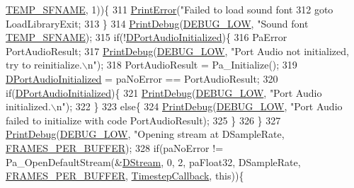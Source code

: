 \begin{DoxyCode}
{{{{{{{{{{{{      \hyperlink{SoundLibraryMixer_8cpp_a1ba6e33012d926b97ef45f11d1f703ac}{TEMP\_SFNAME}, 1))\{
311         \hyperlink{Debug_8h_a2ed825eefefe35baf59a93a8c641323d}{PrintError}(\textcolor{stringliteral}{"Failed to load sound font %
312         \textcolor{keywordflow}{goto} LoadLibraryExit;
313     \}
314     \hyperlink{Debug_8h_aa5f00f5537c9760f6ae1782460748ab9}{PrintDebug}(\hyperlink{Debug_8h_a3a5f3fc09784650d8388cb854882f840}{DEBUG\_LOW}, \textcolor{stringliteral}{"Sound font %
      \hyperlink{SoundLibraryMixer_8cpp_a1ba6e33012d926b97ef45f11d1f703ac}{TEMP\_SFNAME});
315     \textcolor{keywordflow}{if}(!\hyperlink{classCSoundLibraryMixer_a1c78419f5e6cfdf4bc879bb5eedf52f0}{DPortAudioInitialized})\{
316         PaError PortAudioResult;
317         \hyperlink{Debug_8h_aa5f00f5537c9760f6ae1782460748ab9}{PrintDebug}(\hyperlink{Debug_8h_a3a5f3fc09784650d8388cb854882f840}{DEBUG\_LOW}, \textcolor{stringliteral}{"Port Audio not initialized, try to reinitialize.\(\backslash\)n"});
318         PortAudioResult = Pa\_Initialize();    
319         \hyperlink{classCSoundLibraryMixer_a1c78419f5e6cfdf4bc879bb5eedf52f0}{DPortAudioInitialized} = paNoError == PortAudioResult;
320         \textcolor{keywordflow}{if}(\hyperlink{classCSoundLibraryMixer_a1c78419f5e6cfdf4bc879bb5eedf52f0}{DPortAudioInitialized})\{
321             \hyperlink{Debug_8h_aa5f00f5537c9760f6ae1782460748ab9}{PrintDebug}(\hyperlink{Debug_8h_a3a5f3fc09784650d8388cb854882f840}{DEBUG\_LOW}, \textcolor{stringliteral}{"Port Audio initialized.\(\backslash\)n"});
322         \}
323         \textcolor{keywordflow}{else}\{
324             \hyperlink{Debug_8h_aa5f00f5537c9760f6ae1782460748ab9}{PrintDebug}(\hyperlink{Debug_8h_a3a5f3fc09784650d8388cb854882f840}{DEBUG\_LOW}, \textcolor{stringliteral}{"Port Audio failed to initialize with code %
      PortAudioResult);
325         \}
326     \}
327     \hyperlink{Debug_8h_aa5f00f5537c9760f6ae1782460748ab9}{PrintDebug}(\hyperlink{Debug_8h_a3a5f3fc09784650d8388cb854882f840}{DEBUG\_LOW}, \textcolor{stringliteral}{"Opening stream at %
      DSampleRate, \hyperlink{SoundLibraryMixer_8cpp_af4f62216aa14e0407faa6631e9ec4c62}{FRAMES\_PER\_BUFFER});
328     \textcolor{keywordflow}{if}(paNoError != Pa\_OpenDefaultStream(&\hyperlink{classCSoundLibraryMixer_ad992cd6202130db3a45ca695eca34625}{DStream}, 0, 2, paFloat32, DSampleRate, 
      \hyperlink{SoundLibraryMixer_8cpp_af4f62216aa14e0407faa6631e9ec4c62}{FRAMES\_PER\_BUFFER}, \hyperlink{classCSoundLibraryMixer_a1d04553aa93769b8bff4bb5c8b7bdfa1}{TimestepCallback}, \textcolor{keyword}{this}))\{
}}}}}}}}}}}}}}}}
\end{DoxyCode}
